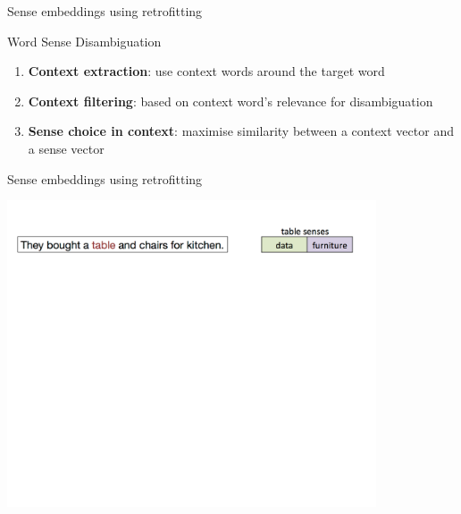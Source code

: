 \begin{frame}{Sense embeddings using retrofitting}
	
	\begin{block}{Word Sense Disambiguation}
	
	\begin{enumerate} 
	\item \textbf{\alert{Context extraction}}: use context words around the target word
	\item \textbf{\alert{Context filtering}}: based on context word's relevance for disambiguation
	
	\item \textbf{\alert{Sense choice in context}}: maximise similarity between a context vector and a sense vector
	
	\end{enumerate}
	\end{block}

\end{frame}


\begin{frame}{Sense embeddings using retrofitting}
\vspace{-3em}
\begin{center}
\includegraphics[width=0.82\textwidth]{figures/wsd-1}
\end{center}	
\end{frame}



